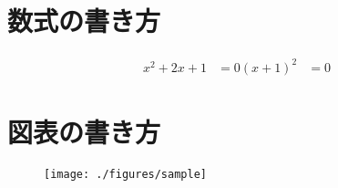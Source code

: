 \documentclass[11pt,a4paper]{jsarticle}
\begin{document}
\section{数式の書き方}

\begin{align}
x^2 + 2x + 1 &= 0
(x + 1)^2 &= 0
\end{align}

\section{図表の書き方}

\begin{figure}
  \centering
  \texttt{[image: ./figures/sample]}
\end{figure}
\end{document}
